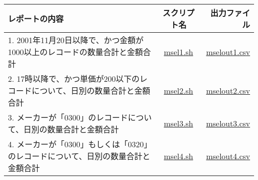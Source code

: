 \begin{table}[htbp]
{\small
\begin{tabular}{ l | c || r }
\hline
\textbf{レポートの内容}   & \textbf{スクリプト名} & \textbf{出力ファイル}  \\
\hline
1. 2001年11月20日以降で、かつ金額が1000以上のレコードの数量合計と金額合計 & \href{exercise/msel1.sh}{msel1.sh} & \href{exercise/outdat/mselout1.csv}{mselout1.csv} \\
2. 17時以降で、かつ単価が200以下のレコードについて、日別の数量合計と金額合計 
 & \href{exercise/msel2.sh}{msel2.sh} & \href{exercise/outdat/mselout2.csv}{mselout2.csv} \\
3. メーカーが「0300」のレコードについて、日別の数量合計と金額合計 & \href{exercise/msel3.sh}{msel3.sh} & \href{exercise/outdat/mselout3.csv}{mselout3.csv} \\
4. メーカーが「0300」もしくは「0320」のレコードについて、日別の数量合計と金額合計 & \href{exercise/msel4.sh}{msel4.sh} & \href{exercise/outdat/mselout4.csv}{mselout4.csv} \\
\hline
\end{tabular} 
}
\end{table} 


%
